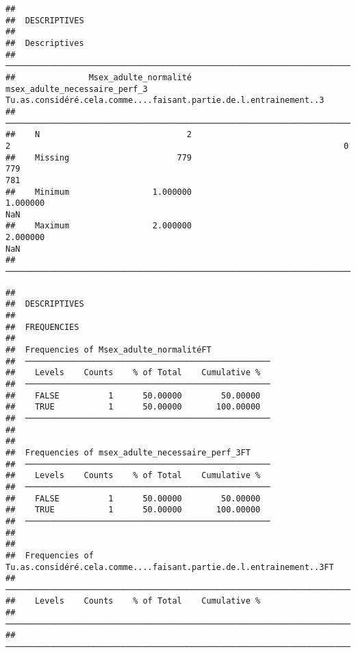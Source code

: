 \documentclass[
]{article}
\begin{document}
\begin{verbatim}
## 
##  DESCRIPTIVES
## 
##  Descriptives                                                                                                                               
##  ────────────────────────────────────────────────────────────────────────────────────────────────────────────────────────────────────────── 
##               Msex_adulte_normalité    msex_adulte_necessaire_perf_3    Tu.as.considéré.cela.comme....faisant.partie.de.l.entrainement..3   
##  ────────────────────────────────────────────────────────────────────────────────────────────────────────────────────────────────────────── 
##    N                              2                                2                                                                    0   
##    Missing                      779                              779                                                                  781   
##    Minimum                 1.000000                         1.000000                                                                  NaN   
##    Maximum                 2.000000                         2.000000                                                                  NaN   
##  ──────────────────────────────────────────────────────────────────────────────────────────────────────────────────────────────────────────
\end{verbatim}

\begin{verbatim}
## 
##  DESCRIPTIVES
## 
##  FREQUENCIES
## 
##  Frequencies of Msex_adulte_normalitéFT             
##  ────────────────────────────────────────────────── 
##    Levels    Counts    % of Total    Cumulative %   
##  ────────────────────────────────────────────────── 
##    FALSE          1      50.00000        50.00000   
##    TRUE           1      50.00000       100.00000   
##  ────────────────────────────────────────────────── 
## 
## 
##  Frequencies of msex_adulte_necessaire_perf_3FT     
##  ────────────────────────────────────────────────── 
##    Levels    Counts    % of Total    Cumulative %   
##  ────────────────────────────────────────────────── 
##    FALSE          1      50.00000        50.00000   
##    TRUE           1      50.00000       100.00000   
##  ────────────────────────────────────────────────── 
## 
## 
##  Frequencies of Tu.as.considéré.cela.comme....faisant.partie.de.l.entrainement..3FT 
##  ────────────────────────────────────────────────────────────────────────────────── 
##    Levels    Counts    % of Total    Cumulative %   
##  ────────────────────────────────────────────────────────────────────────────────── 
##  ──────────────────────────────────────────────────────────────────────────────────
\end{verbatim}
\end{document}
